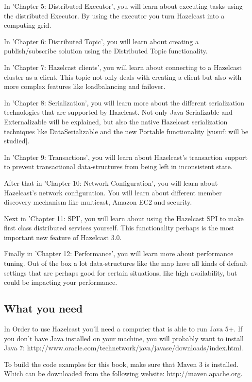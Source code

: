 In 'Chapter 5: Distributed Executor', you will learn about executing tasks using the distributed Executor. By using  the executor you turn Hazelcast into a computing grid. 

In 'Chapter 6: Distributed Topic', you will learn about creating a publish/subscribe solution using the Distributed Topic functionality.

In 'Chapter 7: Hazelcast clients', you will learn about connecting to a Hazelcast cluster as a client. This topic not only deals with creating a client but also with more complex features like loadbalancing and failover.

In 'Chapter 8: Serialization', you will learn more about the different serialization technologies that are supported by Hazelcast. Not only Java Serializable and Externalizable will be explained, but also the native Hazelcast serialization techniques like DataSerializable and the new Portable functionality [yusuf: will be studied].

In 'Chapter 9: Transactions', you will learn about Hazelcast's transaction support to prevent transactional data-structures from being left in inconsistent state.

After that in 'Chapter 10: Network Configuration', you will learn about Hazelcast's network configuration. You will learn about different member discovery mechanism like multicast, Amazon EC2 and security. 

Next in 'Chapter 11: SPI', you will learn about using the Hazelcast SPI to make first class distributed services yourself. This functionality perhaps is the most important new feature of Hazelcast 3.0.

Finally in 'Chapter 12: Performance', you will learn more about performance tuning.  Out of the box a lot data-structures like the map have all kinds of default settings that are perhaps good for certain situations, like high availability, but could be impacting your performance. 

\subsection*{What you need}
In Order to use Hazelcast you'll need a computer that is able to run Java 5+. If you don't have Java installed on your machine, you will probably want to install Java 7: 
http://www.oracle.com/technetwork/java/javase/downloads/index.html. 

To build the code examples for this book, make sure that Maven 3 is installed. Which can be downloaded from the following website: http://maven.apache.org.

